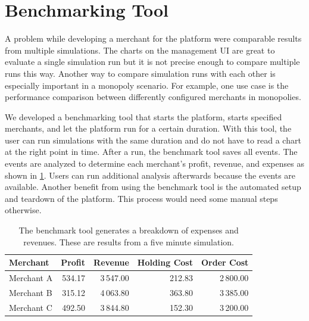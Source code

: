 \section{Benchmarking Tool}
\label{section:benchmark_tool}
A problem while developing a merchant for the \pricewars platform were comparable results from multiple simulations.
The charts on the management UI are great to evaluate a single simulation run but it is not precise enough to compare multiple runs this way.
Another way to compare simulation runs with each other is especially important in a monopoly scenario.
For example, one use case is the performance comparison between
differently configured merchants in monopolies.

We developed a benchmarking tool that starts the platform, starts specified merchants, and let the platform run for a certain duration.
With this tool, the user can run simulations with the same duration and do not have to read a chart at the right point in time.
After a run, the benchmark tool saves all events.
The events are analyzed to determine each merchant's profit, revenue, and expenses as shown in \cref{tab:benchmark_tool}.
Users can run additional analysis afterwards because the events are available.
Another benefit from using the benchmark tool is the automated setup and teardown of the platform.
This process would need some manual steps otherwise.

\begin{table}[t]
\centering
\begin{tabular}{ lrrrr }
	\toprule
	Merchant & Profit & Revenue & Holding Cost & Order Cost \\
	\midrule
	Merchant A & 534.17 & 3\,547.00 & 212.83 & 2\,800.00 \\
	Merchant B & 315.12 & 4\,063.80 & 363.80 & 3\,385.00 \\
	Merchant C & 492.50 & 3\,844.80 & 152.30 & 3\,200.00 \\
	\bottomrule
\end{tabular}
\caption{The benchmark tool generates a breakdown of expenses and revenues. These are results from a five minute simulation.}
\label{tab:benchmark_tool}
\end{table}
